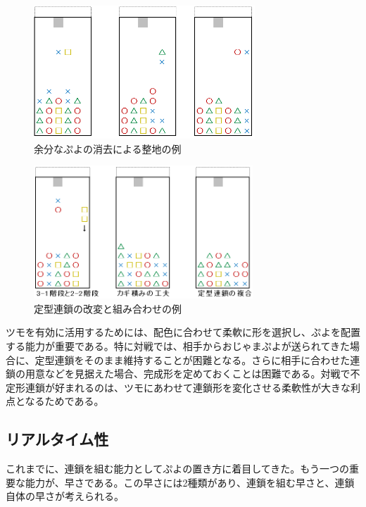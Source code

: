 \documentclass[12pt]{jarticle}
\begin{document}
\begin{figure}[hbt]
  \begin{center}
  \includegraphics[height=5cm]{img/teikei_del.png}
  \caption{余分なぷよの消去による整地の例} \label{fig:teikei_del}
\end{center}
\end{figure}

\begin{figure}[hbt]
  \begin{center}
  \includegraphics[height=5cm]{img/teikei_combi.png}
  \caption{定型連鎖の改変と組み合わせの例} \label{fig:teikei_combi}
\end{center}
\end{figure}

ツモを有効に活用するためには、配色に合わせて柔軟に形を選択し、ぷよを配置する能力が重要である。特に対戦では、相手からおじゃまぷよが送られてきた場合に、定型連鎖をそのまま維持することが困難となる。さらに相手に合わせた連鎖の用意などを見据えた場合、完成形を定めておくことは困難である。対戦で不定形連鎖が好まれるのは、ツモにあわせて連鎖形を変化させる柔軟性が大きな利点となるためである。


\subsection{リアルタイム性}
これまでに、連鎖を組む能力としてぷよの置き方に着目してきた。もう一つの重要な能力が、早さである。この早さには2種類があり、連鎖を組む早さと、連鎖自体の早さが考えられる。
\end{document}
